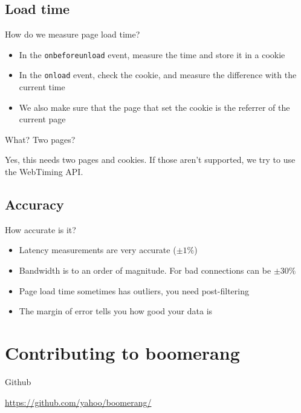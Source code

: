 \documentclass{beamer}
\begin{document}
\subsection{Load time}
\begin{frame}{How do we measure page load time?}
  \begin{itemize}
  \item In the \texttt{onbeforeunload} event, measure the time and store it in a cookie
  \item In the \texttt{onload} event, check the cookie, and measure the difference with the current time
  \item We also make sure that the page that set the cookie is the referrer of the current page
  \end{itemize}
\end{frame}

\begin{frame}{What? Two pages?}
  \begin{center}
  Yes, this needs two pages and cookies.  If those aren't supported, we try to use the WebTiming API.
  \end{center}
\end{frame}

\subsection{Accuracy}
\begin{frame}{How accurate is it?}
  \begin{itemize}
  \item Latency measurements are very accurate (\(\pm 1\%\))
  \item Bandwidth is to an order of magnitude. For bad connections can be \(\pm 30\%\)
  \item Page load time sometimes has outliers, you need post-filtering
  \item The margin of error tells you how good your data is
  \end{itemize}
\end{frame}

\section{Contributing to boomerang}

\begin{frame}{Github}
\begin{center}
\href{https://github.com/yahoo/boomerang/}{https://github.com/yahoo/boomerang/}
\end{center}
\end{frame}
\end{document}
